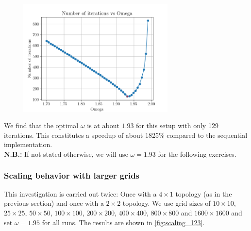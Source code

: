 \begin{figure}[H]
    \centering
    \includegraphics[width=0.7\textwidth]{../fig/lab1/best_omega_122.png}
    \caption{}
    \label{fig:best_omega_122}
\end{figure}
We find that the optimal $\omega$ is at about $1.93$ for this setup with only 129 iterations. This constitutes a speedup of about 1825\% compared to the sequential implementation. \\

\textbf{N.B.:} If not stated otherwise, we will use $\omega = 1.93$ for the following exercises. 

\subsubsection{Scaling behavior with larger grids}
\label{subsec:scaling}
This investigation is carried out twice: Once with a $4\times 1$ topology (as in the previous section) and once with a $2\times 2$ topology. We use grid sizes of $10\times 10$, $25\times 25$, $50\times 50$, $100\times 100$, $200\times 200$, $400\times 400$, $800\times 800$ and $1600\times 1600$ and set $\omega = 1.95$ for all runs. The results are shown in \autoref{fig:scaling_123}.

